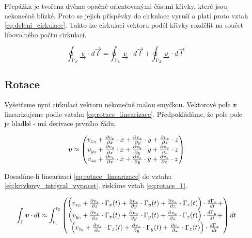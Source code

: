 Přepážka je tvořena dvěma opačně orientovanými částmi křivky, které jsou nekonečně blízké. Proto se jejich příspěvky do cirkulace vyruší a platí proto vztah \eqref{eq:deleni_cirkulace}. Takto lze cirkulaci vektoru podél křivky rozdělit na součet libovolného počtu cirkulací.

\begin{equation}
\label{eq:deleni_cirkulace}
\begin{split}
\oint_{\Gamma_S} \underrightarrow{v} \cdot d\overrightarrow{l} = \oint_{\Gamma_1} \underrightarrow{v} \cdot d\overrightarrow{l} + \oint_{\Gamma_2} \underrightarrow{v} \cdot d\overrightarrow{l}
\end{split}
\end{equation}

\subsection{Rotace}
\label{sec:rotace}

Vyšetřeme nyní cirkulaci vektoru nekonečně malou smyčkou. Vektorové pole \(\boldsymbol{v}\) linearizujeme podle vztahu \eqref{eq:rotace_linearizace}.
Předpokládáme, že pole pole je hladké - má derivace prvního řádu.

\begin{equation}
\label{eq:rotace_linearizace}
\boldsymbol{v} \approx \begin{pmatrix}
v_{x_0} + \frac{\partial v_x}{\partial x} \cdot x + \frac{\partial v_x}{\partial y} \cdot y + \frac{\partial v_x}{\partial z} \cdot z \\
v_{y_0} + \frac{\partial v_y}{\partial x} \cdot x + \frac{\partial v_y}{\partial y} \cdot y + \frac{\partial v_y}{\partial z} \cdot z \\
v_{z_0} + \frac{\partial v_z}{\partial x} \cdot x + \frac{\partial v_z}{\partial y} \cdot y + \frac{\partial v_z}{\partial z} \cdot z
\end{pmatrix}
\end{equation}

Dosadíme-li linearizaci \eqref{eq:rotace_linearizace} do vztahu \eqref{eq:krivkovy_integral_vypocet}, získáme vztah \eqref{eq:rotace_1}.

\begin{equation}
\label{eq:rotace_1}
\int_\Gamma \boldsymbol{v} \cdot d\boldsymbol{l} \approx
\int_{t_1}^{t_2} \begin{pmatrix}
\left(v_{x_0} + \frac{\partial v_x}{\partial x} \cdot \Gamma_x(t) + \frac{\partial v_x}{\partial y} \cdot \Gamma_y(t) + \frac{\partial v_x}{\partial z} \cdot \Gamma_z(t)\right) \cdot \frac{d \Gamma_x}{dt} + \\
\left(v_{y_0} + \frac{\partial v_y}{\partial x} \cdot \Gamma_x(t) + \frac{\partial v_y}{\partial y} \cdot \Gamma_y(t) + \frac{\partial v_y}{\partial z} \cdot \Gamma_z(t)\right) \cdot \frac{d \Gamma_y}{dt} + \\
\left(v_{z_0} + \frac{\partial v_z}{\partial x} \cdot \Gamma_x(t) + \frac{\partial v_z}{\partial y} \cdot \Gamma_y(t) + \frac{\partial v_z}{\partial z} \cdot \Gamma_z(t)\right) \cdot \frac{d \Gamma_z}{dt}
\end{pmatrix} dt
\end{equation}

